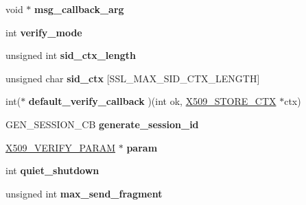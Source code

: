 \begin{DoxyCompactItemize}
\item 
\hypertarget{structssl__ctx__st_ad1aba043a97ea40fcb8a39e65698f8c0}{}void $\ast$ {\bfseries msg\+\_\+callback\+\_\+arg}\label{structssl__ctx__st_ad1aba043a97ea40fcb8a39e65698f8c0}

\item 
\hypertarget{structssl__ctx__st_a31f82e30439244c12f51daff24fd40d8}{}int {\bfseries verify\+\_\+mode}\label{structssl__ctx__st_a31f82e30439244c12f51daff24fd40d8}

\item 
\hypertarget{structssl__ctx__st_a59afab8285fbc901d590ab6edaa75bd0}{}unsigned int {\bfseries sid\+\_\+ctx\+\_\+length}\label{structssl__ctx__st_a59afab8285fbc901d590ab6edaa75bd0}

\item 
\hypertarget{structssl__ctx__st_a92f94c2a4612e04ec3c075c76aae5553}{}unsigned char {\bfseries sid\+\_\+ctx} \mbox{[}S\+S\+L\+\_\+\+M\+A\+X\+\_\+\+S\+I\+D\+\_\+\+C\+T\+X\+\_\+\+L\+E\+N\+G\+T\+H\mbox{]}\label{structssl__ctx__st_a92f94c2a4612e04ec3c075c76aae5553}

\item 
\hypertarget{structssl__ctx__st_aa6c4ede4479002d346cee1bb1be14a46}{}int($\ast$ {\bfseries default\+\_\+verify\+\_\+callback} )(int ok, \hyperlink{structx509__store__ctx__st}{X509\+\_\+\+S\+T\+O\+R\+E\+\_\+\+C\+T\+X} $\ast$ctx)\label{structssl__ctx__st_aa6c4ede4479002d346cee1bb1be14a46}

\item 
\hypertarget{structssl__ctx__st_a4485f799f50830d69fa26e7514b032dc}{}G\+E\+N\+\_\+\+S\+E\+S\+S\+I\+O\+N\+\_\+\+C\+B {\bfseries generate\+\_\+session\+\_\+id}\label{structssl__ctx__st_a4485f799f50830d69fa26e7514b032dc}

\item 
\hypertarget{structssl__ctx__st_a27c15c2ea4e216baacb44a5bf166cfa1}{}\hyperlink{struct_x509___v_e_r_i_f_y___p_a_r_a_m__st}{X509\+\_\+\+V\+E\+R\+I\+F\+Y\+\_\+\+P\+A\+R\+A\+M} $\ast$ {\bfseries param}\label{structssl__ctx__st_a27c15c2ea4e216baacb44a5bf166cfa1}

\item 
\hypertarget{structssl__ctx__st_a325f28f265dae1b20da7c813e41bdb96}{}int {\bfseries quiet\+\_\+shutdown}\label{structssl__ctx__st_a325f28f265dae1b20da7c813e41bdb96}

\item 
\hypertarget{structssl__ctx__st_aab1f54a0e69246d749a6f6ad249c2176}{}unsigned int {\bfseries max\+\_\+send\+\_\+fragment}\label{structssl__ctx__st_aab1f54a0e69246d749a6f6ad249c2176}


\end{DoxyCompactItemize}
